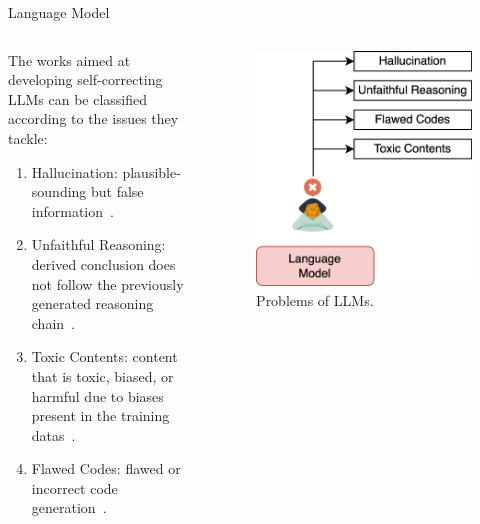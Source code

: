 \begin{frame}{Language Model}
    \begin{columns}[T]
        \begin{column}{0.70\textwidth}
            The works aimed at developing self-correcting LLMs can be classified according to the issues they tackle:
            \begin{enumerate}
                \item Hallucination: plausible-sounding but false information~\cite{gao2023rarr, zhang2023language}.

                \item Unfaithful Reasoning: derived conclusion does not follow the previously generated reasoning chain~\cite{he2022rethinking, pan2023logiclm}.

                \item Toxic Contents: content that is toxic, biased, or harmful due to biases present in the training datas~\cite{lu2022quark, gou2023critic}.

                \item Flawed Codes: flawed or incorrect code generation~\cite{chen2023teaching, olausson2023selfrepair}.
            \end{enumerate}
        \end{column}
        \begin{column}{0.30\textwidth}
            \begin{figure}[!htb]
                \centering
                \includegraphics[scale=0.08]{img/language_model}
                \captionsetup{font=small}
                \caption{Problems of LLMs.}
            \end{figure}
        \end{column}
    \end{columns}
\end{frame}

